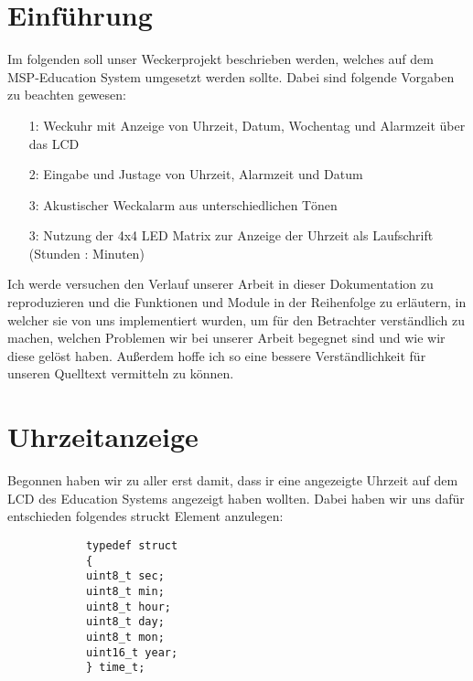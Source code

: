 \documentclass[openright,twoside,12pt,a4paper]{scrartcl}
\begin{document}
	\begin{flushleft}
		\section{Einführung}
		Im folgenden soll unser Weckerprojekt beschrieben werden, welches auf dem MSP-Education System umgesetzt werden sollte. Dabei sind folgende Vorgaben zu beachten gewesen:\\
		\begin{itemize}
			\item[1:] Weckuhr mit Anzeige von Uhrzeit, Datum, Wochentag und Alarmzeit über das LCD
			\item[2:] Eingabe und Justage von Uhrzeit, Alarmzeit und Datum
			\item[3:] Akustischer Weckalarm aus unterschiedlichen Tönen
			\item[3:] Nutzung der 4x4 LED Matrix zur Anzeige der Uhrzeit als Laufschrift (Stunden : Minuten)
		\end{itemize}
		Ich werde versuchen den Verlauf unserer Arbeit in dieser Dokumentation zu reproduzieren und die Funktionen und Module in der Reihenfolge zu erläutern, in welcher sie von uns implementiert wurden, um für den Betrachter verständlich zu machen, welchen Problemen wir bei unserer Arbeit begegnet sind und wie wir diese gelöst haben. Außerdem hoffe ich so eine bessere Verständlichkeit für unseren Quelltext vermitteln zu können. 
		\section{Uhrzeitanzeige}
		Begonnen haben wir zu aller erst damit, dass ir eine angezeigte Uhrzeit auf dem LCD des Education Systems angezeigt haben wollten. Dabei haben wir uns dafür entschieden folgendes struckt Element anzulegen:
		\begin{lstlisting}
			typedef struct
			{
			uint8_t sec;
			uint8_t min;
			uint8_t hour;
			uint8_t day;
			uint8_t mon;
			uint16_t year;
			} time_t;
			

\end{lstlisting}
\end{flushleft}
\end{document}
